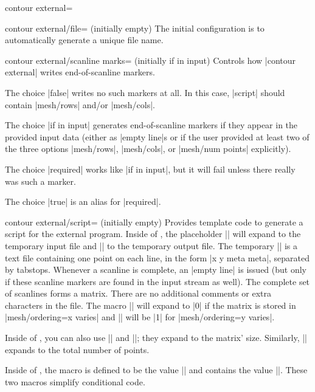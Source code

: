 {{\begin{plottype}[/pgfplots]{contour external=\textcolor{black}{}}
	\begin{pgfplotskey}{contour external/file= (initially empty)}
		The initial configuration is to automatically generate a unique file name.
	\end{pgfplotskey}

	\begin{pgfplotskey}{contour external/scanline marks= (initially if in input)}
		Controls how |contour external| writes end-of-scanline markers. 

		The choice |false| writes no such markers at all. In this case, |script| should contain |mesh/rows| and/or |mesh/cols|.

		The choice |if in input| generates end-of-scanline markers if they appear in the provided input data (either as |empty line|s or if the user provided at least two of the three options |mesh/rows|, |mesh/cols|, or |mesh/num points| explicitly).

		The choice |required| works like |if in input|, but it will fail unless there really was such a marker.

		The choice |true| is an alias for |required|.
	\end{pgfplotskey}

	\begin{pgfplotskey}{contour external/script= (initially empty)}
		Provides template code to generate a script for the external program. Inside of , the placeholder |\infile| will expand to the temporary input file and |\outfile| to the temporary output file. The temporary |\infile| is a text file containing one point on each line, in the form |x y meta meta|, separated by tabstops. Whenever a scanline is complete, an |empty line| is issued (but only if these scanline markers are found in the input stream as well). The complete set of scanlines forms a matrix. There are no additional comments or extra characters in the file. The macro |\ordering| will expand to |0| if the matrix is stored in |mesh/ordering=x varies| and |\ordering| will be |1| for |mesh/ordering=y varies|.

		Inside of , you can also use || and ||; they expand to the matrix' size. Similarly, || expands to the total number of points.

		Inside of , the macro \declareandlabel{\thecontournumber} is defined to be the value || and \declareandlabel{\thecontourlevels} contains the value ||. These two macros simplify conditional code.


\end{pgfplotskey}
\end{plottype}}}
